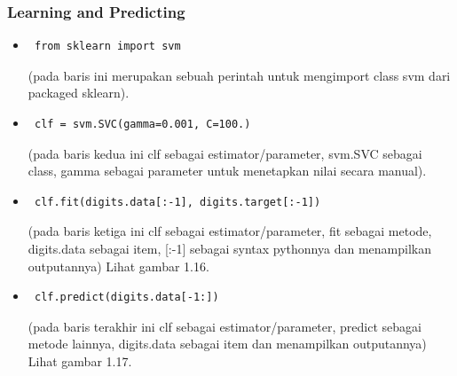 \subsubsection{Learning and Predicting}
\begin{itemize}
\item\begin{verbatim} from sklearn import svm\end{verbatim}(pada baris ini merupakan sebuah perintah untuk mengimport class svm dari packaged sklearn).
\item\begin{verbatim} clf = svm.SVC(gamma=0.001, C=100.)\end{verbatim}(pada baris kedua ini clf sebagai estimator/parameter, svm.SVC sebagai class, gamma sebagai parameter untuk menetapkan nilai secara manual).
\item\begin{verbatim} clf.fit(digits.data[:-1], digits.target[:-1])\end{verbatim}(pada baris ketiga ini clf sebagai estimator/parameter, fit sebagai metode, digits.data sebagai item, [:-1] sebagai syntax pythonnya dan menampilkan outputannya) Lihat gambar 1.16.
\item\begin{verbatim} clf.predict(digits.data[-1:])\end{verbatim}(pada baris terakhir ini clf sebagai estimator/parameter, predict sebagai metode lainnya, digits.data sebagai item dan menampilkan outputannya) Lihat gambar 1.17.
\end{itemize}
